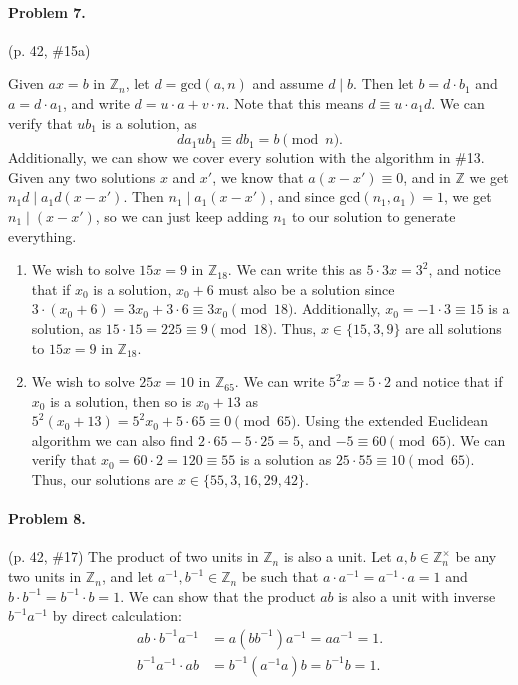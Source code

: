 \documentclass[12pt]{article}
\begin{document}
\paragraph{Problem 7.} (p. 42, \#15a)

Given $ax = b$ in $\mathbb Z_n$, let $d = \mathrm{gcd}(a,n)$ and assume $d \mid b$. Then let $b = d \cdot b_1$ and $a = d \cdot a_1$, and write $d = u \cdot a + v \cdot n$. Note that this means $d \equiv u \cdot a_1 d$. We can verify that $u b_1$ is a solution, as
\[d a_1 u b_1 \equiv d b_1 = b \pmod{n}. \]
Additionally, we can show we cover every solution with the algorithm in \#13. Given any two solutions $x$ and $x'$, we know that $a(x - x') \equiv 0$, and in $\mathbb Z$ we get $n_1 d \mid a_1 d (x - x')$. Then $n_1 \mid a_1 (x-x')$, and since $\mathrm{gcd}(n_1, a_1) = 1$, we get $n_1 \mid (x - x')$, so we can just keep adding $n_1$ to our solution to generate everything.
\begin{enumerate}
\item[a] {
    We wish to solve $15x = 9$ in $\mathbb Z_{18}$. We can write this as $5 \cdot 3x = 3^2$, and notice that if $x_0$ is a solution, $x_0 + 6$ must also be a solution since $3\cdot (x_0 + 6) = 3x_0 + 3\cdot 6 \equiv 3x_0 \pmod{18}$. Additionally, $x_0 = -1 \cdot 3 \equiv 15$ is a solution, as $15\cdot 15 = 225 \equiv 9 \pmod{18}$. Thus, $x \in \{15, 3, 9\}$ are all solutions to $15x = 9$ in $\mathbb Z_{18}$.
}
\item[b] {
    We wish to solve $25x = 10$ in $\mathbb Z_{65}$. We can write $5^2 x = 5\cdot 2$ and notice that if $x_0$ is a solution, then so is $x_0 + 13$ as $5^2 (x_0 + 13) = 5^2 x_0 + 5\cdot 65 \equiv 0 \pmod{65}$. Using the extended Euclidean algorithm we can also find $2 \cdot 65 - 5 \cdot 25 = 5$, and $-5 \equiv 60 \pmod{65}$. We can verify that $x_0 = 60 \cdot 2 = 120 \equiv 55$ is a solution as $25 \cdot 55 \equiv 10 \pmod{65}$. Thus, our solutions are $x \in \{55, 3, 16, 29, 42\}$.
}
\end{enumerate}

\paragraph{Problem 8.} (p. 42, \#17) The product of two units in $\mathbb Z_n$ is also a unit. Let $a, b \in \mathbb Z_n^\times$ be any two units in $\mathbb Z_n$, and let $a^{-1}, b^{-1} \in \mathbb Z_n$ be such that $a \cdot a^{-1} = a^{-1} \cdot a = 1$ and $b \cdot b^{-1} = b^{-1} \cdot b = 1$. We can show that the product $ab$ is also a unit with inverse $b^{-1} a^{-1}$ by direct calculation:
\begin{align*}
    ab\cdot b^{-1}a^{-1} &= a(bb^{-1})a^{-1} = aa^{-1} = 1. \\
    b^{-1}a^{-1}\cdot ab &= b^{-1}(a^{-1}a)b = b^{-1}b = 1.
\end{align*}
\end{document}
